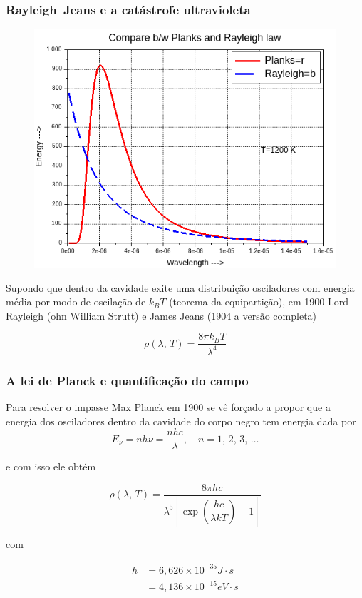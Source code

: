 \documentclass[12pt,brazil]{beamer}
\begin{document}

\begin{frame}
  \frametitle{Rayleigh–Jeans e a catástrofe ultravioleta}

  
  
        \begin{figure}
          \includegraphics[width=6.cm]{figuras/fig08}
        \end{figure}
        \fontsize{9pt}{11pt}\selectfont
        
        Supondo que dentro da cavidade exite uma distribuição osciladores com energia média por modo de oscilação de $k_BT$ (teorema da equipartição), em 1900 Lord Rayleigh (ohn William Strutt) e James Jeans (1904 a versão completa)        
        \fontsize{10pt}{11pt}\selectfont
        
        \[
          \rho (\lambda, \, T) = \dfrac{8\pi k_BT}{\lambda^4}
        \]
  
\end{frame}


\begin{frame}
  \frametitle{A lei de Planck e quantificação do campo}
  
    Para resolver o impasse Max Planck em 1900 se vê forçado a propor que a energia dos osciladores dentro da cavidade do corpo negro tem energia dada por
    \[
      E_{\nu} = nh\nu = \dfrac{nhc}{\lambda}, \quad n=1,\,2,\, 3,\, \ldots
    \]
    
    e com isso ele obtém
    
    \[
      \rho (\lambda, \, T) = \dfrac{8\pi hc }{\lambda^5\left[\exp \left(\dfrac{hc}{\lambda kT}\right) - 1\right]}
    \]
    
    com
    
    \begin{align*}    
      h &= 6,626\times 10^{-35}J\cdot s\\
        &= 4,136\times 10^{-15} eV\cdot s
    \end{align*}


\end{frame}
\end{document}
